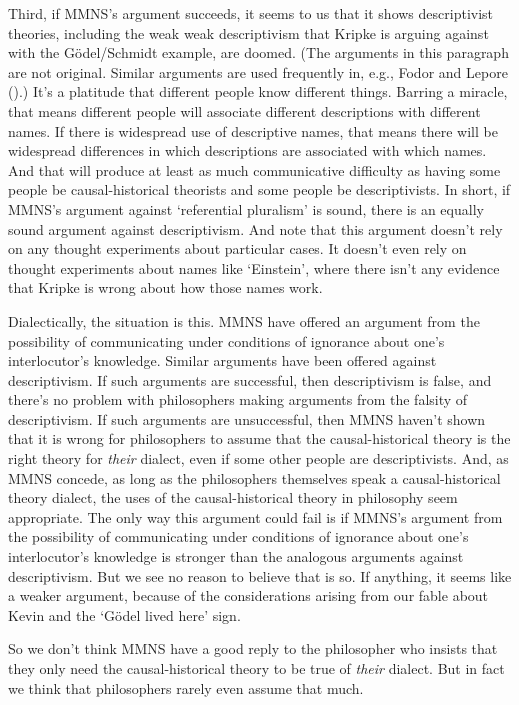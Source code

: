 \documentclass[
  10pt,
  letterpaper,
  DIV=11,
  numbers=noendperiod,
  twoside]{scrartcl}
\begin{document}
Third, if MMNS's argument succeeds, it seems to us that it shows
descriptivist theories, including the weak weak descriptivism that
Kripke is arguing against with the Gödel/Schmidt example, are doomed.
(The arguments in this paragraph are not original. Similar arguments are
used frequently in, e.g., Fodor and Lepore
().) It's a platitude that different
people know different things. Barring a miracle, that means different
people will associate different descriptions with different names. If
there is widespread use of descriptive names, that means there will be
widespread differences in which descriptions are associated with which
names. And that will produce at least as much communicative difficulty
as having some people be causal-historical theorists and some people be
descriptivists. In short, if MMNS's argument against `referential
pluralism' is sound, there is an equally sound argument against
descriptivism. And note that this argument doesn't rely on any thought
experiments about particular cases. It doesn't even rely on thought
experiments about names like `Einstein', where there isn't any evidence
that Kripke is wrong about how those names work.

Dialectically, the situation is this. MMNS have offered an argument from
the possibility of communicating under conditions of ignorance about
one's interlocutor's knowledge. Similar arguments have been offered
against descriptivism. If such arguments are successful, then
descriptivism is false, and there's no problem with philosophers making
arguments from the falsity of descriptivism. If such arguments are
unsuccessful, then MMNS haven't shown that it is wrong for philosophers
to assume that the causal-historical theory is the right theory for
\emph{their} dialect, even if some other people are descriptivists. And,
as MMNS concede, as long as the philosophers themselves speak a
causal-historical theory dialect, the uses of the causal-historical
theory in philosophy seem appropriate. The only way this argument could
fail is if MMNS's argument from the possibility of communicating under
conditions of ignorance about one's interlocutor's knowledge is stronger
than the analogous arguments against descriptivism. But we see no reason
to believe that is so. If anything, it seems like a weaker argument,
because of the considerations arising from our fable about Kevin and the
`Gödel lived here' sign.

So we don't think MMNS have a good reply to the philosopher who insists
that they only need the causal-historical theory to be true of
\emph{their} dialect. But in fact we think that philosophers rarely even
assume that much.
\end{document}
